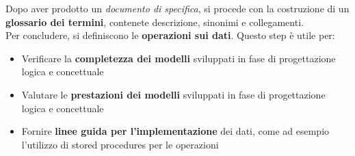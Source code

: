 \documentclass{article}
\begin{document}
Dopo aver prodotto un \textit{documento di specifica}, si procede con la costruzione di un \textbf{glossario dei termini}, contenete descrizione, sinonimi e collegamenti.\vspace*{14pt}\\
Per concludere, si definiscono le \textbf{operazioni sui dati}. Questo step è utile per:
\begin{itemize}[label={-}, leftmargin=1cm]
    \itemsep0em
    \item Verificare la \textbf{completezza dei modelli} sviluppati in fase di progettazione logica e concettuale
    \item Valutare le \textbf{prestazioni dei modelli} sviluppati in fase di progettazione logica e concettuale
    \item Fornire \textbf{linee guida per l'implementazione} dei dati, come ad esempio l'utilizzo di stored procedures per le operazioni
\end{itemize}
\end{document}
